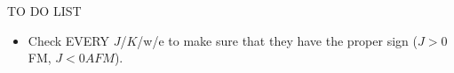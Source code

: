 TO DO LIST
\begin{itemize}
    \item Check EVERY $J$/$K$/w/e to make sure that they have the proper sign ($J>0$ FM, $J<0 AFM$).
\end{itemize}